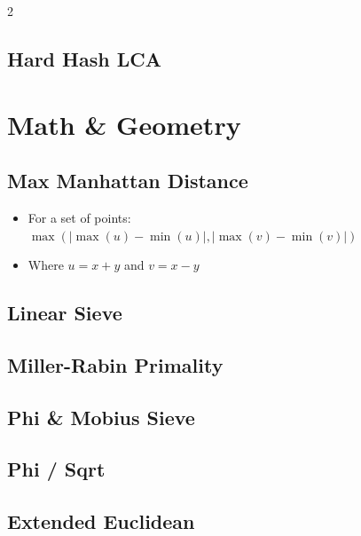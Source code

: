 \documentclass[10pt,a4paper]{extarticle}
\begin{document}
\begin{landscape}
\begin{multicols}{2}
\subsection{Hard Hash LCA}


\section{Math \& Geometry}

\subsection{Max Manhattan Distance}
\begin{itemize}
    \item For a set of points: $\max(| \max(u) - \min(u) |, | \max(v) - \min(v) |)$
    \item Where $u = x + y$ and $v = x - y$
\end{itemize}

\subsection{Linear Sieve}


\subsection{Miller-Rabin Primality}


\subsection{Phi \& Mobius Sieve}


\subsection{Phi / Sqrt}


\subsection{Extended Euclidean}



\end{multicols}
\end{landscape}
\end{document}
